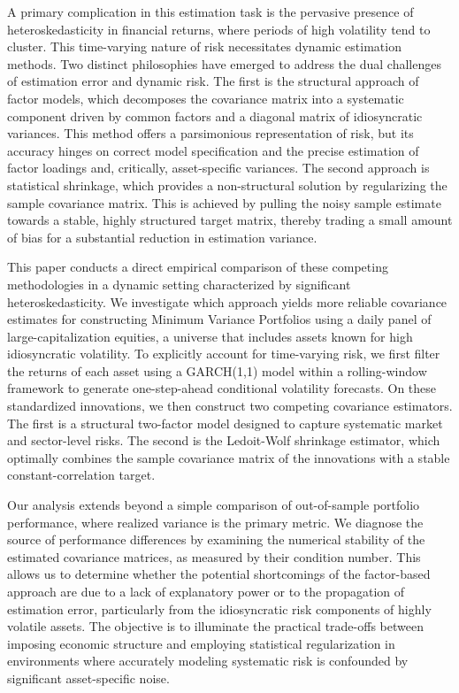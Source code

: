 \documentclass[]{article}
\begin{document}
A primary complication in this estimation task is the pervasive presence of heteroskedasticity in financial returns, where periods of high volatility tend to cluster. This time-varying nature of risk necessitates dynamic estimation methods. Two distinct philosophies have emerged to address the dual challenges of estimation error and dynamic risk. The first is the structural approach of factor models, which decomposes the covariance matrix into a systematic component driven by common factors and a diagonal matrix of idiosyncratic variances. This method offers a parsimonious representation of risk, but its accuracy hinges on correct model specification and the precise estimation of factor loadings and, critically, asset-specific variances. The second approach is statistical shrinkage, which provides a non-structural solution by regularizing the sample covariance matrix. This is achieved by pulling the noisy sample estimate towards a stable, highly structured target matrix, thereby trading a small amount of bias for a substantial reduction in estimation variance.

This paper conducts a direct empirical comparison of these competing methodologies in a dynamic setting characterized by significant heteroskedasticity. We investigate which approach yields more reliable covariance estimates for constructing Minimum Variance Portfolios using a daily panel of large-capitalization equities, a universe that includes assets known for high idiosyncratic volatility. To explicitly account for time-varying risk, we first filter the returns of each asset using a GARCH(1,1) model within a rolling-window framework to generate one-step-ahead conditional volatility forecasts. On these standardized innovations, we then construct two competing covariance estimators. The first is a structural two-factor model designed to capture systematic market and sector-level risks. The second is the Ledoit-Wolf shrinkage estimator, which optimally combines the sample covariance matrix of the innovations with a stable constant-correlation target.

Our analysis extends beyond a simple comparison of out-of-sample portfolio performance, where realized variance is the primary metric. We diagnose the source of performance differences by examining the numerical stability of the estimated covariance matrices, as measured by their condition number. This allows us to determine whether the potential shortcomings of the factor-based approach are due to a lack of explanatory power or to the propagation of estimation error, particularly from the idiosyncratic risk components of highly volatile assets. The objective is to illuminate the practical trade-offs between imposing economic structure and employing statistical regularization in environments where accurately modeling systematic risk is confounded by significant asset-specific noise.
\end{document}
